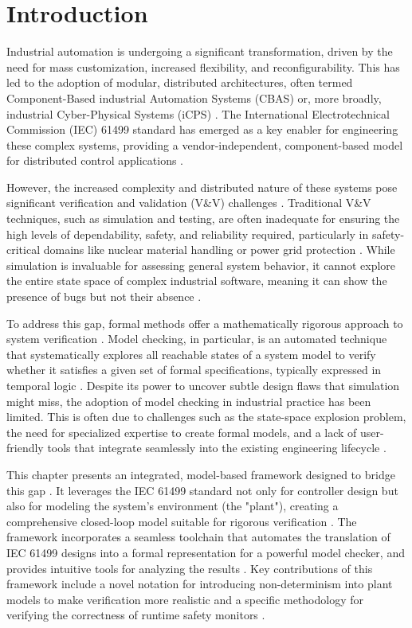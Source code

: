 \section{Introduction}

Industrial automation is undergoing a significant transformation, driven by the need for mass customization, increased flexibility, and reconfigurability. This has led to the adoption of modular, distributed architectures, often termed Component-Based industrial Automation Systems (CBAS) or, more broadly, industrial Cyber-Physical Systems (iCPS) \cite{lee2017introduction}. The International Electrotechnical Commission (IEC) 61499 standard has emerged as a key enabler for engineering these complex systems, providing a vendor-independent, component-based model for distributed control applications \cite{iec61499part12012, dai2017discrete}.

However, the increased complexity and distributed nature of these systems pose significant verification and validation (V\&V) challenges \cite{vyatkin1999modeling}. Traditional V\&V techniques, such as simulation and testing, are often inadequate for ensuring the high levels of dependability, safety, and reliability required, particularly in safety-critical domains like nuclear material handling or power grid protection \cite{clarke1999, schneider2004}. While simulation is invaluable for assessing general system behavior, it cannot explore the entire state space of complex industrial software, meaning it can show the presence of bugs but not their absence \cite{clarke2000, biere2003bounded}.

To address this gap, formal methods offer a mathematically rigorous approach to system verification \cite{clarke1999}. Model checking, in particular, is an automated technique that systematically explores all reachable states of a system model to verify whether it satisfies a given set of formal specifications, typically expressed in temporal logic \cite{emerson1985decision}. Despite its power to uncover subtle design flaws that simulation might miss, the adoption of model checking in industrial practice has been limited. This is often due to challenges such as the state-space explosion problem, the need for specialized expertise to create formal models, and a lack of user-friendly tools that integrate seamlessly into the existing engineering lifecycle \cite{Buzhinsky2020, Cimatti2012}.

This chapter presents an integrated, model-based framework designed to bridge this gap \cite{vyatkin2008closed}. It leverages the IEC 61499 standard not only for controller design but also for modeling the system's environment (the "plant"), creating a comprehensive closed-loop model suitable for rigorous verification \cite{xavier2021cyber}. The framework incorporates a seamless toolchain that automates the translation of IEC 61499 designs into a formal representation for a powerful model checker, and provides intuitive tools for analyzing the results \cite{patil2015formal}. Key contributions of this framework include a novel notation for introducing non-determinism into plant models to make verification more realistic and a specific methodology for verifying the correctness of runtime safety monitors \cite{17jhunjhunwala2022monitoring}.

